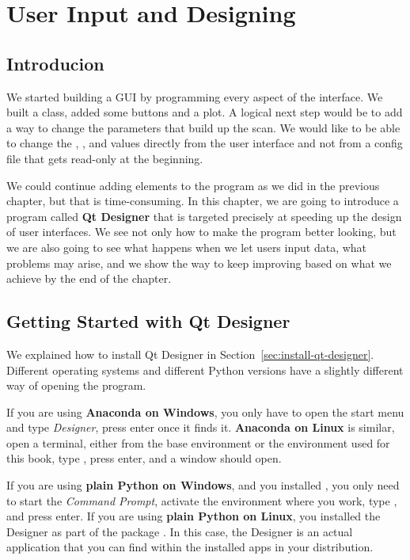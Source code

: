 \chapter{User Input and Designing}\label{ch:user-input-designer}

\section{Introducion}\label{sec:user-input-introduction}
We started building a GUI by programming every aspect of the interface. We built a  class, added some buttons and a plot. A logical next step would be to add a way to change the parameters that build up the scan. We would like to be able to change the , , and  values directly from the user interface and not from a config file that gets read-only at the beginning.

We could continue adding elements to the program as we did in the previous chapter, but that is time-consuming. In this chapter, we are going to introduce a program called \textbf{Qt Designer} that is targeted precisely at speeding up the design of user interfaces. We see not only how to make the program better looking, but we are also going to see what happens when we let users input data, what problems may arise, and we show the way to keep improving based on what we achieve by the end of the chapter.

\section{Getting Started with Qt Designer}\label{sec:getting-started-with-qt-designer}
We explained how to install Qt Designer in Section~\ref{sec:install-qt-designer}. Different operating systems and different Python versions have a slightly different way of opening the program.

If you are using \textbf{Anaconda on Windows}, you only have to open the start menu and type \textit{Designer}, press \py{}enter once it finds it. \textbf{Anaconda on Linux} is similar, open a terminal, either from the base environment or the environment used for this book, type , press enter, and a window should open.

If you are using \textbf{plain Python on Windows}, and you installed , you only need to start the \emph{Command Prompt}, activate the environment where you work, type , and press enter. If you are using \textbf{plain Python on Linux}, you installed the Designer as part of the package . In this case, the Designer is an actual application that you can find within the installed apps in your distribution.

